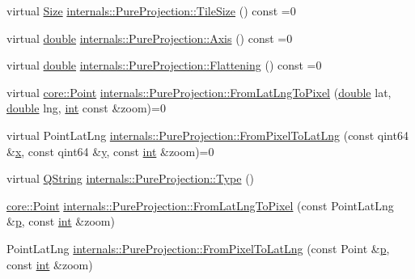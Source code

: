 \begin{DoxyCompactItemize}
\item 
virtual \hyperlink{structcore_1_1_size}{Size} \hyperlink{group___o_p_map_widget_ga745313ff69d0f869f456ccbc312cc2bf}{internals\-::\-Pure\-Projection\-::\-Tile\-Size} () const =0
\item 
virtual \hyperlink{_super_l_u_support_8h_a8956b2b9f49bf918deed98379d159ca7}{double} \hyperlink{group___o_p_map_widget_ga72d36ba021583a6dec5f549c6137494a}{internals\-::\-Pure\-Projection\-::\-Axis} () const =0
\item 
virtual \hyperlink{_super_l_u_support_8h_a8956b2b9f49bf918deed98379d159ca7}{double} \hyperlink{group___o_p_map_widget_ga253e85d9958729b994bf7b9e075297de}{internals\-::\-Pure\-Projection\-::\-Flattening} () const =0
\item 
virtual \hyperlink{structcore_1_1_point}{core\-::\-Point} \hyperlink{group___o_p_map_widget_gacadfc01954e3e37c801106981b297b45}{internals\-::\-Pure\-Projection\-::\-From\-Lat\-Lng\-To\-Pixel} (\hyperlink{_super_l_u_support_8h_a8956b2b9f49bf918deed98379d159ca7}{double} lat, \hyperlink{_super_l_u_support_8h_a8956b2b9f49bf918deed98379d159ca7}{double} lng, \hyperlink{ioapi_8h_a787fa3cf048117ba7123753c1e74fcd6}{int} const \&zoom)=0
\item 
virtual Point\-Lat\-Lng \hyperlink{group___o_p_map_widget_ga235a8ad2ed5da22f78e0c5d447f8d34c}{internals\-::\-Pure\-Projection\-::\-From\-Pixel\-To\-Lat\-Lng} (const qint64 \&\hyperlink{glext_8h_a1db9d104e3c2128177f26aff7b46982f}{x}, const qint64 \&\hyperlink{glext_8h_a42315f3ed8fff752bb47fd782309fcfc}{y}, const \hyperlink{ioapi_8h_a787fa3cf048117ba7123753c1e74fcd6}{int} \&zoom)=0
\item 
virtual \hyperlink{group___u_a_v_objects_plugin_gab9d252f49c333c94a72f97ce3105a32d}{Q\-String} \hyperlink{group___o_p_map_widget_gae371ba9189e5318e016af0df9cf0123f}{internals\-::\-Pure\-Projection\-::\-Type} ()
\item 
\hyperlink{structcore_1_1_point}{core\-::\-Point} \hyperlink{group___o_p_map_widget_ga18aa4617ab63019451badac8567c85d8}{internals\-::\-Pure\-Projection\-::\-From\-Lat\-Lng\-To\-Pixel} (const Point\-Lat\-Lng \&\hyperlink{glext_8h_aa5367c14d90f462230c2611b81b41d23}{p}, const \hyperlink{ioapi_8h_a787fa3cf048117ba7123753c1e74fcd6}{int} \&zoom)
\item 
Point\-Lat\-Lng \hyperlink{group___o_p_map_widget_ga44df6b58603a8cdba19f7bf899cc57bc}{internals\-::\-Pure\-Projection\-::\-From\-Pixel\-To\-Lat\-Lng} (const Point \&\hyperlink{glext_8h_aa5367c14d90f462230c2611b81b41d23}{p}, const \hyperlink{ioapi_8h_a787fa3cf048117ba7123753c1e74fcd6}{int} \&zoom)

\end{DoxyCompactItemize}
